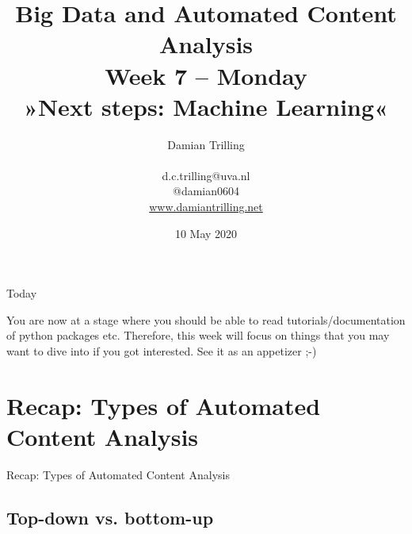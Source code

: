 \documentclass{beamer}
\begin{document}
\title[Big Data and Automated Content Analysis]{\textbf{Big Data and Automated Content Analysis} \\ Week 7 -- Monday \\ »Next steps: Machine Learning«}
\author[Damian Trilling]{Damian Trilling \\ ~ \\ \footnotesize{d.c.trilling@uva.nl \\@damian0604} \\ \url{www.damiantrilling.net}}
\date{10 May 2020}


\begin{frame}{}
\titlepage
\end{frame}

\begin{frame}{Today}
\tableofcontents
\end{frame}

\begin{frame}[plain]
You are now at a stage where you should be able to read tutorials/documentation of python packages etc. Therefore, this week will focus on things that you may want to dive into if you got interested. See it as an appetizer ;-)
  \end{frame}



\section[Recap]{Recap: Types of Automated Content Analysis}
\begin{frame}{}
Recap: Types of Automated Content Analysis
\end{frame}
\subsection*{Top-down vs. bottom-up}


\begin{frame}[plain]
\end{frame}
\end{document}
